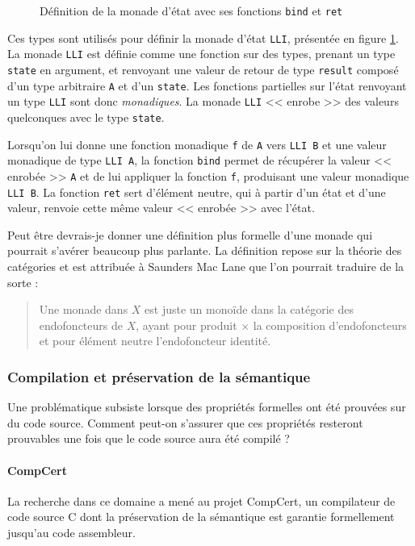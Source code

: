 \begin{figure}[!h]
	\caption{Définition de la monade d'état avec ses fonctions \texttt{bind} et \texttt{ret}}
	\label{code:monad}
\end{figure}

Ces types sont utilisés pour définir la monade d'état \texttt{LLI}, présentée en figure \ref{code:monad}. La monade \texttt{LLI} est définie comme une fonction sur des types, prenant un type \texttt{state} en argument, et renvoyant une valeur de retour de type \texttt{result} composé d'un type arbitraire \texttt{A} et d'un \texttt{state}. Les fonctions partielles sur l'état renvoyant un type \texttt{LLI} sont donc \emph{monadiques}. La monade \texttt{LLI} << enrobe >> des valeurs quelconques avec le type \texttt{state}.

Lorsqu'on lui donne une fonction monadique \texttt{f} de \texttt{A} vers \texttt{LLI B} et une valeur monadique de type \texttt{LLI A}, la fonction \texttt{bind} permet de récupérer la valeur << enrobée >> \texttt{A} et de lui appliquer la fonction \texttt{f}, produisant une valeur monadique \texttt{LLI B}. La fonction \texttt{ret} sert d'élément neutre, qui à partir d'un état et d'une valeur, renvoie cette même valeur << enrobée >> avec l'état.

Peut être devrais-je donner une définition plus formelle d'une monade qui pourrait s'avérer beaucoup plus parlante. La définition repose sur la théorie des catégories et est attribuée à Saunders Mac Lane \cite[134]{mac2013categories} que l'on pourrait traduire de la sorte :

\blockquote{Une monade dans $X$ est juste un monoïde dans la catégorie des endofoncteurs de $X$, ayant pour produit $\times$ la composition d'endofoncteurs et pour élément neutre l'endofoncteur identité.}

			\subsubsection{Compilation et préservation de la sémantique}
			\label{compilation}
				Une problématique subsiste lorsque des propriétés formelles ont été prouvées sur du code source. Comment peut-on s'assurer que ces propriétés resteront prouvables une fois que le code source aura été compilé ?

				\paragraph{CompCert} La recherche dans ce domaine a mené au projet CompCert\cite{Leroy-backend}, un compilateur de code source C dont la préservation de la sémantique est garantie formellement jusqu'au code assembleur.

